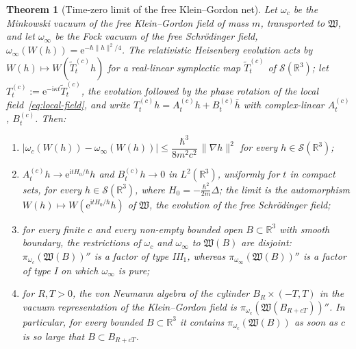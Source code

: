 \documentclass[%
 aip,
 jmp,
 amsmath,amssymb,
 reprint, onecolumn
]{revtex4-1}
\newtheorem{theorem}{Theorem}
\theoremstyle{definition}
\theoremstyle{remark}
\newcommand{\R}{\mathbb{R}}
\newcommand{\rmi}{\mathrm{i}}
\newcommand{\rme}{\mathrm{e}}
\begin{document}
\begin{theorem}[Time-zero limit of the free Klein--Gordon net]
\label{thm:net}
Let $\omega_c$ be the Minkowski vacuum of the free Klein--Gordon field of
mass $m$, transported to $\mathfrak W$, and let $\omega_\infty$ be the
Fock vacuum of the free Schr\"odinger field, $\omega_\infty(W(h))=
\rme^{-\hbar\|h\|^2/4}$. The relativistic Heisenberg evolution acts by
$W(h)\mapsto W(\tilde T^{(c)}_th)$ for a real-linear symplectic map
$\tilde T^{(c)}_t$ of $\mathcal S(\R^3)$; let $T^{(c)}_t:=\rme^{-\rmi\kappa
t}\tilde T^{(c)}_t$, the evolution followed by the phase rotation of the
local field~\eqref{eq:local-field}, and write $T^{(c)}_t h=A^{(c)}_th+B^{(c)}_t\bar h$ with complex-linear
$A^{(c)}_t$, $B^{(c)}_t$. Then:
\begin{enumerate}[label=(\alph*)]
\item $|\omega_c(W(h))-\omega_\infty(W(h))|\leq\dfrac{\hbar^3}{8m^2c^2}\,
\|\nabla h\|^2$ for every $h\in\mathcal S(\R^3)$;
\item $A^{(c)}_th\to\rme^{\rmi tH_0/\hbar}h$ and $B^{(c)}_th\to0$ in
$L^2(\R^3)$, uniformly for $t$ in compact sets, for every
$h\in\mathcal S(\R^3)$, where $H_0=-\frac{\hbar^2}{2m}\Delta$; the limit
is the automorphism $W(h)\mapsto W(\rme^{\rmi tH_0/\hbar}h)$ of
$\mathfrak W$, the evolution of the free Schr\"odinger field;
\item for every finite $c$ and every non-empty bounded open
$B\subset\R^3$ with smooth boundary, the restrictions of $\omega_c$ and $\omega_\infty$ to
$\mathfrak W(B)$ are disjoint: $\pi_{\omega_c}(\mathfrak W(B))''$ is a
factor of type III$_1$, whereas $\pi_{\omega_\infty}(\mathfrak W(B))''$ is a
factor of type I on which $\omega_\infty$ is pure;
\item for $R,T>0$, the von Neumann algebra of the cylinder
$B_R\times(-T,T)$ in the vacuum representation of the Klein--Gordon field
is $\pi_{\omega_c}(\mathfrak W(B_{R+cT}))''$. In particular, for
every bounded $B\subset\R^3$ it contains $\pi_{\omega_c}(\mathfrak W(B))$
as soon as $c$ is so large that $B\subset B_{R+cT}$.
\end{enumerate}
\end{theorem}
\end{document}
